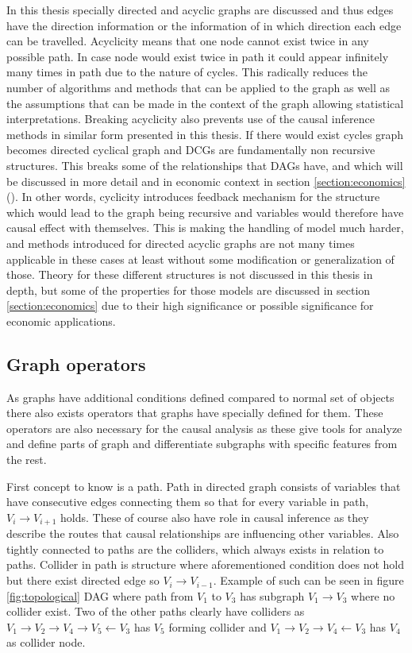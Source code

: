 \documentclass[main=english,12pt,a4paper,pdftex,econ,utf8]{aaltothesis}
\begin{document}


In this thesis specially directed and acyclic graphs are discussed and thus edges have the direction information or the information of in which direction each edge can be travelled. Acyclicity means that one node cannot exist twice in any possible path. In case node would exist twice in path it could appear infinitely many times in path due to the nature of cycles. This radically reduces the number of algorithms and methods that can be applied to the graph as well as the assumptions that can be made in the context of the graph allowing statistical interpretations. Breaking acyclicity also prevents use of the causal inference methods in similar form presented in this thesis. If there would exist cycles graph becomes directed cyclical graph and DCGs are fundamentally non recursive structures. This breaks some of the relationships that DAGs have, and which will be discussed in more detail and in economic context in section \ref{section:economics} (\cite{Heckman2015}). In other words, cyclicity introduces feedback mechanism for the structure which would lead to the graph being recursive and variables would therefore have causal effect with themselves. This is making the handling of model much harder, and methods introduced for directed acyclic graphs are not many times applicable in these cases at least without some modification or generalization of those. Theory for these different structures is not discussed in this thesis in depth, but some of the properties for those models are discussed in section \ref{section:economics} due to their high significance or possible significance for economic applications.

\subsection{Graph operators}

As graphs have additional conditions defined compared to normal set of objects there also exists operators that graphs have specially defined for them. These operators are also necessary for the causal analysis as these give tools for analyze and define parts of graph and differentiate subgraphs with specific features from the rest.

First concept to know is a path. Path in directed graph consists of variables that have consecutive edges connecting them so that for every variable in path, $V_{i}\rightarrow V_{i+1}$ holds. These of course also have role in causal inference as they describe the routes that causal relationships are influencing other variables. Also tightly connected to paths are the colliders, which always exists in relation to paths. Collider in path is structure where aforementioned condition does not hold but there exist directed edge so $V_{i}\rightarrow V_{i-1}$. Example of such can be seen in figure \ref{fig:topological} DAG where path from $V_{1}$ to $V_{3}$ has subgraph $V_{1}\rightarrow V_{3}$ where no collider exist. Two of the other paths clearly have colliders as $V_{1}\rightarrow V_{2}\rightarrow V_{4}\rightarrow V_{5}\leftarrow V_{3}$ has $V_{5}$ forming collider and $V_{1}\rightarrow V_{2}\rightarrow V_{4}\leftarrow V_{3}$ has $V_{4}$ as collider node.
\end{document}
